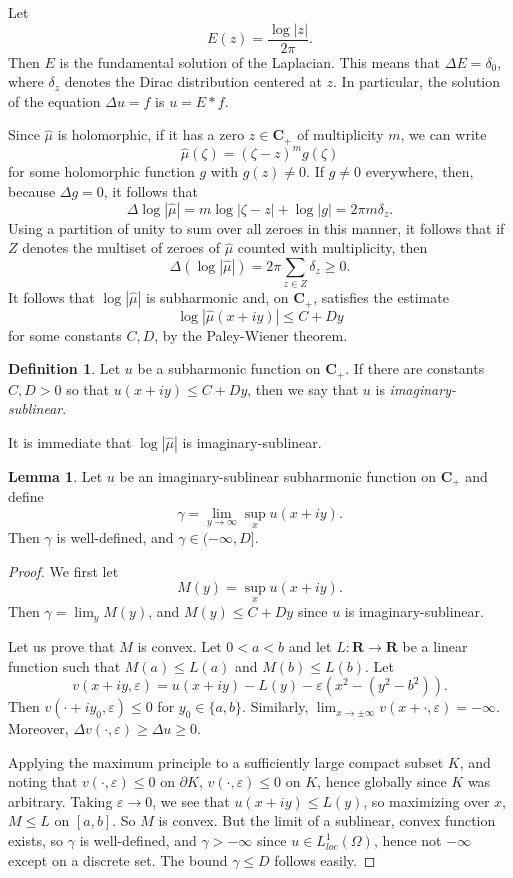 \documentclass[12pt]{report}
\newcommand{\RR}{\mathbf{R}}
\newcommand{\CC}{\mathbf{C}}
\newcommand{\dfn}[1]{\emph{#1}\index{#1}}
\theoremstyle{definition}
\newtheorem{lemma}[theorem]{Lemma}
\newtheorem{definition}[theorem]{Definition}
\begin{document}
Let
$$E(z) = \frac{\log |z|}{2\pi}.$$
Then $E$ is the fundamental solution of the Laplacian. This means that $\Delta E = \delta_0$, where $\delta_z$ denotes the Dirac distribution centered at $z$. In particular, the solution of the equation $\Delta u = f$ is $u = E*f$.

Since $\hat \mu$ is holomorphic, if it has a zero $z \in \CC_+$ of multiplicity $m$, we can write
$$\hat \mu(\zeta) = (\zeta - z)^m g(\zeta)$$
for some holomorphic function $g$ with $g(z) \neq 0$. If $g \neq 0$ everywhere, then, because $\Delta g = 0$, it follows that
$$\Delta \log |\hat \mu| = m\log |\zeta - z| + \log |g| = 2\pi m \delta_z.$$
Using a partition of unity to sum over all zeroes in this manner, it follows that if $Z$ denotes the multiset of zeroes of $\hat \mu$ counted with multiplicity, then
$$\Delta(\log |\hat \mu|) = 2\pi \sum_{z \in Z} \delta_z \geq 0.$$
It follows that $\log |\hat \mu|$ is subharmonic and, on $\CC_+$, satisfies the estimate
$$\log |\hat \mu(x + iy)| \leq C + Dy$$
for some constants $C, D$, by the Paley-Wiener theorem.

\begin{definition}
    Let $u$ be a subharmonic function on $\CC_+$. If there are constants $C, D > 0$ so that $u(x + iy) \leq C + Dy$, then we say that $u$ is \dfn{imaginary-sublinear}.
\end{definition}
It is immediate that $\log |\hat \mu|$ is imaginary-sublinear.

\begin{lemma}
    \label{imaginary sublinear limit}
    Let $u$ be an imaginary-sublinear subharmonic function on $\CC_+$ and define
    $$\gamma = \lim_{y \to \infty} \sup_x u(x + iy).$$
    Then $\gamma$ is well-defined, and $\gamma \in (-\infty, D]$.
\end{lemma}
\begin{proof}
    We first let
    $$M(y) = \sup_x u(x + iy).$$
    Then $\gamma = \lim_y M(y)$, and $M(y) \leq C + Dy$ since $u$ is imaginary-sublinear.

    Let us prove that $M$ is convex. Let $0 < a < b$ and let $L: \RR \to \RR$ be a linear function such that $M(a) \leq L(a)$ and $M(b) \leq L(b)$. Let
    $$v(x + iy, \varepsilon) = u(x + iy) - L(y) - \varepsilon(x^2 - (y^2 - b^2)).$$
    Then $v(\cdot + iy_0, \varepsilon) \leq 0$ for $y_0 \in \{a, b\}$. Similarly, $\lim_{x \to \pm \infty} v(x + \cdot, \varepsilon) = -\infty$. Moreover, $\Delta v(\cdot, \varepsilon) \geq \Delta u \geq 0$.

    Applying the maximum principle to a sufficiently large compact subset $K$, and noting that $v(\cdot, \varepsilon) \leq 0$ on $\partial K$, $v(\cdot, \varepsilon) \leq 0$ on $K$, hence globally since $K$ was arbitrary. Taking $\varepsilon \to 0$, we see that $u(x + iy) \leq L(y)$, so maximizing over $x$, $M \leq L$ on $[a, b]$. So $M$ is convex. But the limit of a sublinear, convex function exists, so $\gamma$ is well-defined, and $\gamma > -\infty$ since $u \in L^1_{loc}(\Omega)$, hence not $-\infty$ except on a discrete set. The bound $\gamma \leq D$ follows easily.
\end{proof}
\end{document}

